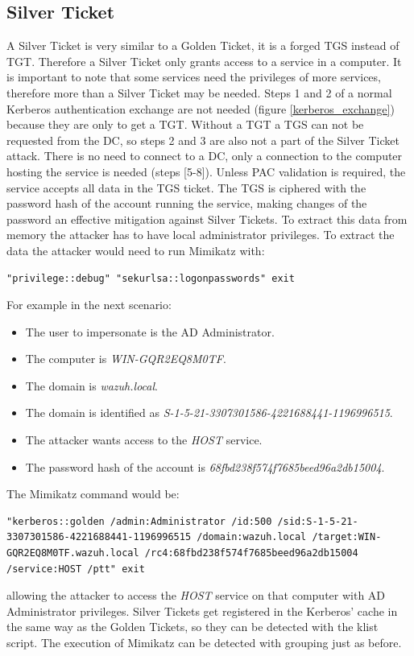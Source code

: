 \subsection{Silver Ticket}
A Silver Ticket is very similar to a Golden Ticket, it is a forged TGS instead of TGT. Therefore a Silver Ticket only grants access to a service in a computer. It is important to note that some services need the privileges of more services, therefore more than a Silver Ticket may be needed.
\linej
Steps 1 and 2 of a normal Kerberos authentication exchange are not needed (figure \ref{kerberos_exchange}) because they are only to get a TGT. Without a TGT a TGS can not be requested from the DC, so steps 2 and 3 are also not a part of the Silver Ticket attack.
\linej
There is no need to connect to a DC, only a connection to the computer hosting the service is needed (steps [5-8]). Unless PAC validation is required, the service accepts all data in the TGS ticket.
\linej
The TGS is ciphered with the password hash of the account running the service, making changes of the password an effective mitigation against Silver Tickets.
To extract this data from memory the attacker has to have local administrator privileges\cite{events_1}\cite{silver_ticket}.
\linej
\linej
To extract the data the attacker would need to run Mimikatz with:
\begin{lstlisting}[style=PS,numbers=none]
"privilege::debug" "sekurlsa::logonpasswords" exit
\end{lstlisting}
\linej
For example in the next scenario:
\begin{itemize}
	\item The user to impersonate is the AD Administrator.
	\item The computer is \textit{WIN-GQR2EQ8M0TF}.
	\item The domain is \textit{wazuh.local}.
	\item The domain is identified as \textit{S-1-5-21-3307301586-4221688441-1196996515}.
	\item The attacker wants access to the \textit{HOST} service.
	\item The password hash of the account is \textit{68fbd238f574f7685beed96a2db15004}.
\end{itemize}
The Mimikatz command would be:
\begin{lstlisting}[style=PS,numbers=none]
"kerberos::golden /admin:Administrator /id:500 /sid:S-1-5-21-3307301586-4221688441-1196996515 /domain:wazuh.local /target:WIN-GQR2EQ8M0TF.wazuh.local /rc4:68fbd238f574f7685beed96a2db15004 /service:HOST /ptt" exit
\end{lstlisting}
allowing the attacker to access the \textit{HOST} service on that computer with AD Administrator privileges.
\linej
\linej
Silver Tickets get registered in the Kerberos' cache in the same way as the Golden Tickets, so they can be detected with the klist script. The execution of Mimikatz can be detected with grouping just as before.

